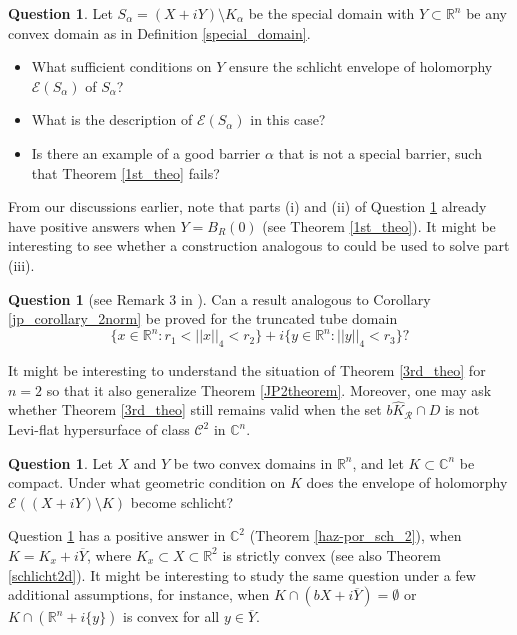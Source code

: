 \documentclass[12pt,reqno, a4paper]{amsart}
\theoremstyle{definition}
\newtheorem{ques}[theorem]{Question}
\theoremstyle{definition}
\numberwithin{equation}{section}
\def\R{\mathbb{R}}                              %
\def\C{\mathbb{C}}                              %
\begin{document}
\begin{ques}\label{open_qs_1}
Let $S_{\alpha}=(X+iY)\setminus K_{\alpha}$ be the special domain with $Y\subset \R^n$ be any convex domain as in Definition \ref{special_domain}. 
\begin{itemize}
\item [(i)] What sufficient conditions on $Y$ ensure the schlicht envelope of holomorphy $\mathcal{E}(S_{\alpha})$ of
$S_{\alpha}$?
\vspace{0.2cm}

\item [(ii)] What is the description of $\mathcal{E}(S_{\alpha})$ in this case?

\vspace{0.2cm}
\item[(iii)] Is there an example of a good barrier $\alpha$ that is not a special barrier, such that Theorem \ref{1st_theo} fails?
\end{itemize}

\end{ques}
From our discussions earlier, note that parts (i) and (ii) of Question \ref{open_qs_1} already have positive answers when $Y=B_R(0)$ (see Theorem \ref{1st_theo}). It might be interesting to see whether a construction analogous to \cite[Example 4.3]{haz-por} could be used to solve part (iii).

\begin{ques}[see Remark 3 in \cite{JP2}]
Can a result analogous to Corollary \ref{jp_corollary_2norm} be proved for the truncated tube domain $$\{x \in \R^n: r_1<||x||_4<r_2\}+i\{y\in \R^n:||y||_4<r_3\}?$$
\end{ques}
It might be interesting to understand the situation of Theorem \ref{3rd_theo} for $n=2$ so that it also generalize Theorem \ref{JP2theorem}. Moreover, one may ask whether Theorem \ref{3rd_theo} still remains valid when the set $b\widehat{K}_{\mathcal{R}}\cap D$ is not Levi-flat hypersurface of class $\mathcal{C}^2$ in $\C^n$.

\begin{ques}\label{open_qs_3}
Let $X$ and $Y$ be two convex domains in $\R^n$, and let $K\subset \C^n$ be compact. Under what geometric condition on $K$ does the envelope of holomorphy $\mathcal{E}((X+iY)\setminus K)$ become schlicht?
\end{ques}
Question \ref{open_qs_3} has a positive answer in $\C^2$ (Theorem \ref{haz-por_sch_2}),
when $K=K_x+i\overline{Y}$, where $K_x\subset X\subset \R^2$ is strictly convex (see also Theorem \ref{schlicht2d}). It might be interesting to study the same question under a few additional assumptions, for instance, when $K\cap (bX+i\overline{Y})=\emptyset$ or $K\cap (\R^n+i\{y\})$ is convex for all $y\in \overline{Y}.$\\
\end{document}

